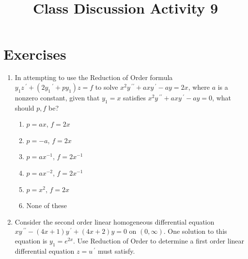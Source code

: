 \documentclass{ximera}
\begin{document}
\begin{abstract}
 \end{abstract}

    \title{Class Discussion Activity 9}
    
    \maketitle

\section*{Exercises}



\begin{enumerate}[label=(\arabic*)]

\item In attempting to use the Reduction of Order formula\\ $y_1 z\,^{\prime}  +(2y_1\,^{\prime}+py_1)z=f$ to solve $x^2 y\,^{\prime\prime} +axy\,^{\prime}-ay=2x$, where $a$ is a nonzero constant, given that $y_1=x$ satisfies $x^2 y\,^{\prime\prime} +a xy\,^{\prime}-ay=0$, what should $p,f$ be?


\begin{enumerate}[label=(\alph*)]
\item $p=ax$, $f=2x$
\item $p=-a$, $f=2x$
\item $p=ax^{-1}$, $f=2x^{-1}$  %
\item $p=ax^{-2}$, $f=2x^{-1}$
\item $p=x^2$, $f=2x$ 
\item None of these
\end{enumerate}


\item Consider the second order linear homogeneous differential equation \\$xy\,^{\prime\prime}-(4x+1)y\,^{\prime}+(4x+2)y=0$ on $(0,\infty)$.  One solution to this equation is $y_1=e^{2x}$.  Use Reduction of Order to determine a first order linear differential equation $z=u\,^{\prime}$ must satisfy.







\end{enumerate}
\end{document}

